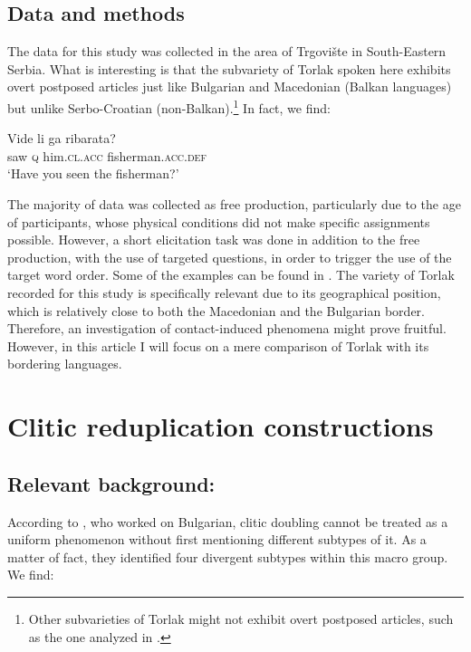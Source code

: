\documentclass[output=paper,
colorlinks,
citecolor=brown,
newtxmath
]{langscibook}
\begin{document}
\subsection{Data and methods}
\label{sec:dataandmethods}
The data for this study was collected in the area of Trgovište in South-Eastern Serbia. What is interesting is that the subvariety of Torlak spoken here exhibits overt postposed articles just like Bulgarian and Macedonian (Balkan languages) but unlike Serbo-Croatian (non-Balkan).\footnote{Other subvarieties of Torlak might not exhibit overt postposed articles, such as the one analyzed in \citet{Runic2013,Runic2014}.} In fact, we find:


\ea\label{ex:5}
\gll Vide li  ga         ribarata?\\
     saw  \textsc{q}   him.\textsc{cl.acc} fisherman.\textsc{acc.def}\\
\glt `Have you seen the fisherman?'
\z

\noindent The majority of data was collected as free production, particularly due to the age of participants, whose physical conditions did not make specific assignments possible. However, a short elicitation task was done in addition to the free production, with the use of targeted questions, in order to trigger the use of the target word order. Some of the examples can be found in . The variety of Torlak recorded for this study is specifically relevant due to its geographical position, which is relatively close to both the Macedonian and the Bulgarian border. Therefore, an investigation of contact-induced phenomena might prove fruitful. However, in this article I will focus on a mere comparison of Torlak with its bordering languages.
%
%

    \largerpage[-2]

\section{Clitic reduplication constructions}
\label{sec:reduplications}

\subsection{Relevant background: \citet{Cinque.Krapova2008}}
\label{subsec:relevantbackground}
According to \citet{Cinque.Krapova2008}, who worked on Bulgarian, clitic doubling cannot be treated as a uniform phenomenon without first mentioning different subtypes of it. As a matter of fact, they identified four divergent subtypes within this macro group. We find:
\end{document}
